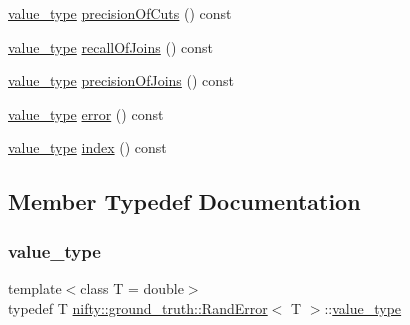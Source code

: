 \begin{DoxyCompactItemize}
\item 
\hyperlink{classnifty_1_1ground__truth_1_1RandError_a8ccf604387e3b5ed939c97c22c75acf9}{value\+\_\+type} \hyperlink{classnifty_1_1ground__truth_1_1RandError_af50f7794ed6532afbabcac826e21355d}{precision\+Of\+Cuts} () const
\item 
\hyperlink{classnifty_1_1ground__truth_1_1RandError_a8ccf604387e3b5ed939c97c22c75acf9}{value\+\_\+type} \hyperlink{classnifty_1_1ground__truth_1_1RandError_a468ab404c1f5c0bf0a9b7069a48593ee}{recall\+Of\+Joins} () const
\item 
\hyperlink{classnifty_1_1ground__truth_1_1RandError_a8ccf604387e3b5ed939c97c22c75acf9}{value\+\_\+type} \hyperlink{classnifty_1_1ground__truth_1_1RandError_ae2ebc221dd0ede53eb15faac8cbce64e}{precision\+Of\+Joins} () const
\item 
\hyperlink{classnifty_1_1ground__truth_1_1RandError_a8ccf604387e3b5ed939c97c22c75acf9}{value\+\_\+type} \hyperlink{classnifty_1_1ground__truth_1_1RandError_adcab0d43233f1a39934d4a79c2546485}{error} () const
\item 
\hyperlink{classnifty_1_1ground__truth_1_1RandError_a8ccf604387e3b5ed939c97c22c75acf9}{value\+\_\+type} \hyperlink{classnifty_1_1ground__truth_1_1RandError_a2e0c1d35e71072c4e77fecdd23e27ca4}{index} () const
\end{DoxyCompactItemize}


\subsection{Member Typedef Documentation}
\mbox{\label{classnifty_1_1ground__truth_1_1RandError_a8ccf604387e3b5ed939c97c22c75acf9}} 
\subsubsection{\texorpdfstring{value\+\_\+type}{value\_type}}
{\footnotesize\ttfamily template$<$class T  = double$>$ \\
typedef T \hyperlink{classnifty_1_1ground__truth_1_1RandError}{nifty\+::ground\+\_\+truth\+::\+Rand\+Error}$<$ T $>$\+::\hyperlink{classnifty_1_1ground__truth_1_1RandError_a8ccf604387e3b5ed939c97c22c75acf9}{value\+\_\+type}}



